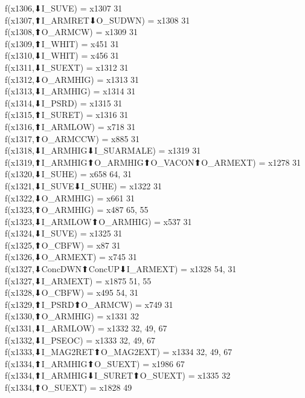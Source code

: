 f(x1306,⬇I_SUVE) = x1307 {31} \\
f(x1307,⬆I_ARMRET⬇O_SUDWN) = x1308 {31} \\
f(x1308,⬆O_ARMCW) = x1309 {31} \\
f(x1309,⬆I_WHIT) = x451 {31} \\
f(x1310,⬇I_WHIT) = x456 {31} \\
f(x1311,⬇I_SUEXT) = x1312 {31} \\
f(x1312,⬇O_ARMHIG) = x1313 {31} \\
f(x1313,⬇I_ARMHIG) = x1314 {31} \\
f(x1314,⬇I_PSRD) = x1315 {31} \\
f(x1315,⬆I_SURET) = x1316 {31} \\
f(x1316,⬆I_ARMLOW) = x718 {31} \\
f(x1317,⬆O_ARMCCW) = x885 {31} \\
f(x1318,⬇I_ARMHIG⬇I_SUARMALE) = x1319 {31} \\
f(x1319,⬆I_ARMHIG⬆O_ARMHIG⬆O_VACON⬆O_ARMEXT) = x1278 {31} \\
f(x1320,⬇I_SUHE) = x658 {64, 31} \\
f(x1321,⬇I_SUVE⬇I_SUHE) = x1322 {31} \\
f(x1322,⬇O_ARMHIG) = x661 {31} \\
f(x1323,⬆O_ARMHIG) = x487 {65, 55} \\
f(x1323,⬇I_ARMLOW⬆O_ARMHIG) = x537 {31} \\
f(x1324,⬇I_SUVE) = x1325 {31} \\
f(x1325,⬆O_CBFW) = x87 {31} \\
f(x1326,⬇O_ARMEXT) = x745 {31} \\
f(x1327,⬇ConcDWN⬆ConcUP⬇I_ARMEXT) = x1328 {54, 31} \\
f(x1327,⬇I_ARMEXT) = x1875 {51, 55} \\
f(x1328,⬇O_CBFW) = x495 {54, 31} \\
f(x1329,⬆I_PSRD⬆O_ARMCW) = x749 {31} \\
f(x1330,⬆O_ARMHIG) = x1331 {32} \\
f(x1331,⬇I_ARMLOW) = x1332 {32, 49, 67} \\
f(x1332,⬇I_PSEOC) = x1333 {32, 49, 67} \\
f(x1333,⬇I_MAG2RET⬆O_MAG2EXT) = x1334 {32, 49, 67} \\
f(x1334,⬆I_ARMHIG⬆O_SUEXT) = x1986 {67} \\
f(x1334,⬆I_ARMHIG⬇I_SURET⬆O_SUEXT) = x1335 {32} \\
f(x1334,⬆O_SUEXT) = x1828 {49} \\
